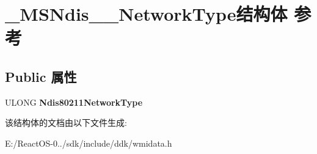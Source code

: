\hypertarget{struct___m_s_ndis__80211___network_type}{}\section{\+\_\+\+M\+S\+Ndis\+\_\+\_\+\+Network\+Type结构体 参考}
\label{struct___m_s_ndis__80211___network_type}
\subsection*{Public 属性}
\begin{DoxyCompactItemize}
\item 
\mbox{\label{struct___m_s_ndis__80211___network_type_a206248f56b38e3d29caa3c50d27e7ae4}} 
U\+L\+O\+NG {\bfseries Ndis80211\+Network\+Type}
\end{DoxyCompactItemize}


该结构体的文档由以下文件生成\+:\begin{DoxyCompactItemize}
\item 
E\+:/\+React\+O\+S-\/0../sdk/include/ddk/wmidata.\+h\end{DoxyCompactItemize}
